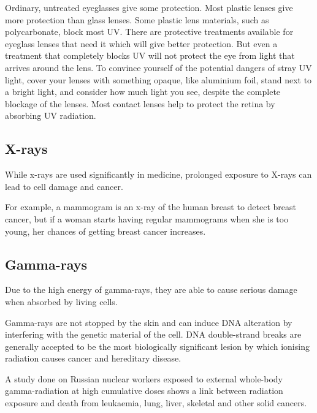 Ordinary, untreated eyeglasses give some protection. Most plastic lenses give more protection than glass lenses. Some plastic lens materials, such as polycarbonate, block most UV. There are protective treatments available for eyeglass lenses that need it which will give better protection. But even a treatment that completely blocks UV will not protect the eye from light that arrives around the lens. To convince yourself of the potential dangers of stray UV light, cover your lenses with something opaque, like aluminium foil, stand next to a bright light, and consider how much light you see, despite the complete blockage of the lenses. Most contact lenses help to protect the retina by absorbing UV radiation.

\subsection{X-rays}
While x-rays are used significantly in medicine, prolonged exposure to X-rays can lead to cell damage and cancer.

For example, a mammogram is an x-ray of the human breast to detect breast cancer, but if a woman starts having regular mammograms when she is too young, her chances of getting breast cancer increases.

\subsection{Gamma-rays}
Due to the high energy of gamma-rays, they are able to cause serious damage when absorbed by living cells.

Gamma-rays are not stopped by the skin and can induce DNA alteration by interfering with the genetic material of the cell. DNA double-strand breaks are generally accepted to be the most biologically significant lesion by which ionising radiation causes cancer and hereditary disease.

A study done on Russian nuclear workers exposed to external whole-body gamma-radiation at high cumulative doses shows a link between radiation exposure and death from leukaemia, lung, liver, skeletal and other solid cancers.


